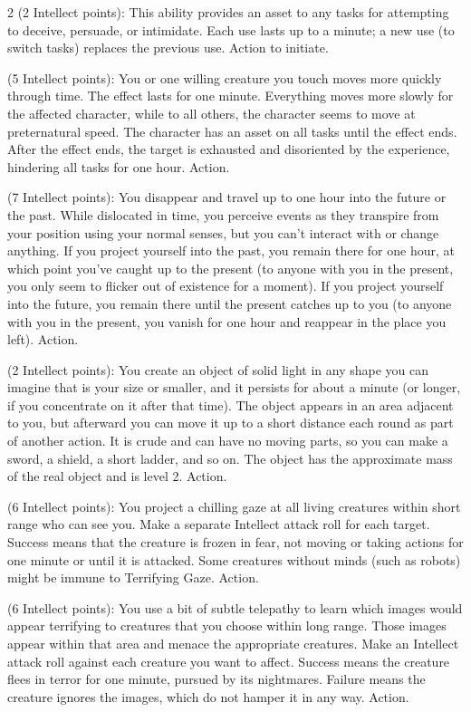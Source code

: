 \begin{multicols}{2}
 (2 Intellect points): This ability provides an asset to any tasks for attempting to deceive, persuade, or intimidate. Each use lasts up to a minute; a new use (to switch tasks) replaces the previous use. Action to initiate. 
 
 (5 Intellect points): You or one willing creature you touch moves more quickly through time. The effect lasts for one minute. Everything moves more slowly for the affected character, while to all others, the character seems to move at preternatural speed. The character has an asset on all tasks until the effect ends. After the effect ends, the target is exhausted and disoriented by the experience, hindering all tasks for one hour. Action. 
 
 (7 Intellect points): You disappear and travel up to one hour into the future or the past. While dislocated in time, you perceive events as they transpire from your position using your normal senses, but you can’t interact with or change anything. If you project yourself into the past, you remain there for one hour, at which point you’ve caught up to the present (to anyone with you in the present, you only seem to flicker out of existence for a moment). If you project yourself into the future, you remain there until the present catches up to you (to anyone with you in the present, you vanish for one hour and reappear in the place you left). Action. 
 
 (2 Intellect points): You create an object of solid light in any shape you can imagine that is your size or smaller, and it persists for about a minute (or longer, if you concentrate on it after that time). The object appears in an area adjacent to you, but afterward you can move it up to a short distance each round as part of another action. It is crude and can have no moving parts, so you can make a sword, a shield, a short ladder, and so on. The object has the approximate mass of the real object and is level 2. Action.

 (6 Intellect points): You project a chilling gaze at all living creatures within short range who can see you. Make a separate Intellect attack roll for each target. Success means that the creature is frozen in fear, not moving or taking actions for one minute or until it is attacked. Some creatures without minds (such as robots) might be immune to Terrifying Gaze. Action. 
 
 (6 Intellect points): You use a bit of subtle telepathy to learn which images would appear terrifying to creatures that you choose within long range. Those images appear within that area and menace the appropriate creatures. Make an Intellect attack roll against each creature you want to affect. Success means the creature flees in terror for one minute, pursued by its nightmares. Failure means the creature ignores the images, which do not hamper it in any way. Action. 
 

\end{multicols}
